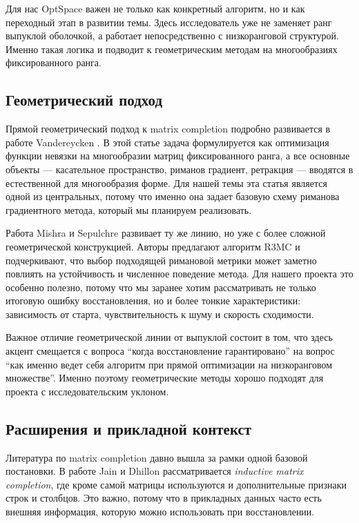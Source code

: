 \documentclass[a4paper,12pt]{article}
\begin{document}
Для нас OptSpace важен не только как конкретный алгоритм, но и как переходный этап в развитии темы. Здесь исследователь уже не заменяет ранг выпуклой оболочкой, а работает непосредственно с низкоранговой структурой. Именно такая логика и подводит к геометрическим методам на многообразиях фиксированного ранга.

\subsection{Геометрический подход}

Прямой геометрический подход к matrix completion подробно развивается в работе Vandereycken \cite{vandereycken}. В этой статье задача формулируется как оптимизация функции невязки на многообразии матриц фиксированного ранга, а все основные объекты --- касательное пространство, риманов градиент, ретракция --- вводятся в естественной для многообразия форме. Для нашей темы эта статья является одной из центральных, потому что именно она задает базовую схему риманова градиентного метода, который мы планируем реализовать.

Работа Mishra и Sepulchre \cite{r3mc} развивает ту же линию, но уже с более сложной геометрической конструкцией. Авторы предлагают алгоритм R3MC и подчеркивают, что выбор подходящей римановой метрики может заметно повлиять на устойчивость и численное поведение метода. Для нашего проекта это особенно полезно, потому что мы заранее хотим рассматривать не только итоговую ошибку восстановления, но и более тонкие характеристики: зависимость от старта, чувствительность к шуму и скорость сходимости.

Важное отличие геометрической линии от выпуклой состоит в том, что здесь акцент смещается с вопроса ``когда восстановление гарантировано'' на вопрос ``как именно ведет себя алгоритм при прямой оптимизации на низкоранговом множестве''. Именно поэтому геометрические методы хорошо подходят для проекта с исследовательским уклоном.

\subsection{Расширения и прикладной контекст}

Литература по matrix completion давно вышла за рамки одной базовой постановки. В работе Jain и Dhillon \cite{inductive} рассматривается \textit{inductive matrix completion}, где кроме самой матрицы используются и дополнительные признаки строк и столбцов. Это важно, потому что в прикладных данных часто есть внешняя информация, которую можно использовать при восстановлении.
\end{document}
